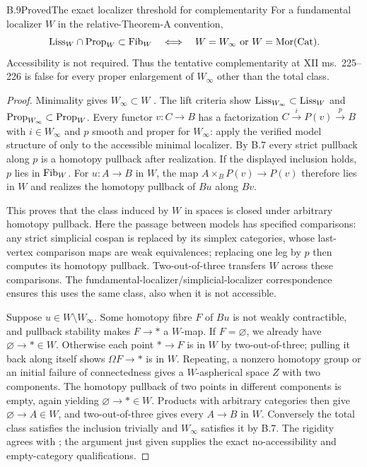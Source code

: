 \begin{claim}{B.9}{Proved}{The exact localizer threshold for complementarity}
For a fundamental localizer $W$ in the relative-Theorem-A convention,
\[
 \mathrm{Liss}_W\cap\mathrm{Prop}_W\subset\mathrm{Fib}_W
 \quad\Longleftrightarrow\quad
 W=W_\infty\ \text{or}\ W=\operatorname{Mor}(\mathrm{Cat}).
\]
Accessibility is not required. Thus the tentative complementarity at
XII ms.~225--226 is false for every proper enlargement of $W_\infty$
other than the total class.
\end{claim}
\begin{proof}
Minimality gives $W_\infty\subset W$
\citep[Corollary 4.2.19]{BCCisinski2006}. The lift criteria show
$\mathrm{Liss}_{W_\infty}\subset\mathrm{Liss}_W$ and
$\mathrm{Prop}_{W_\infty}\subset\mathrm{Prop}_W$.
Every functor $v:C\to B$ has a factorization
$C\xrightarrow{i}P(v)\xrightarrow{p}B$ with $i\in W_\infty$ and $p$
smooth and proper for $W_\infty$: apply the verified model structure of
\citet[Theorem 5.3.14 and Proposition 5.3.13]{BCCisinski2006} only to the
accessible minimal localizer. By B.7 every strict pullback along $p$ is a
homotopy pullback after realization. If the displayed inclusion holds,
$p$ lies in $\mathrm{Fib}_W$. For $u:A\to B$ in $W$, the map
$A\times_BP(v)\to P(v)$ therefore lies in $W$ and realizes the homotopy
pullback of $Bu$ along $Bv$.

This proves that the class induced by $W$ in spaces is closed under arbitrary
homotopy pullback. Here the passage between models has specified comparisons:
any strict simplicial cospan is replaced by its simplex categories, whose
last-vertex comparison maps are weak equivalences; replacing one leg by $p$
then computes its homotopy pullback. Two-out-of-three transfers $W$ across
these comparisons. The fundamental-localizer/simplicial-localizer
correspondence \citep[Theorem 4.2.15]{BCCisinski2006} ensures this uses the
same class, also when it is not accessible.

Suppose $u\in W\setminus W_\infty$. Some homotopy fibre $F$ of $Bu$ is
not weakly contractible, and pullback stability makes $F\to*$ a $W$-map.
If $F=\varnothing$, we already have $\varnothing\to*\in W$.
Otherwise each point $*\to F$ is in $W$ by two-out-of-three; pulling it
back along itself shows $\Omega F\to*$ is in $W$. Repeating, a nonzero
homotopy group or an initial failure of connectedness gives a $W$-aspherical
space $Z$ with two components. The homotopy pullback of two points in
different components is empty, again yielding $\varnothing\to*\in W$.
Products with arbitrary categories then give $\varnothing\to A\in W$,
and two-out-of-three gives every $A\to B$ in $W$.
Conversely the total class satisfies the inclusion trivially and $W_\infty$
satisfies it by B.7. The rigidity agrees with
\citet[Theorem 6.4.22 and Remark 6.4.23]{BCCisinski2006}; the argument just
given supplies the exact no-accessibility and empty-category qualifications.
\end{proof}

